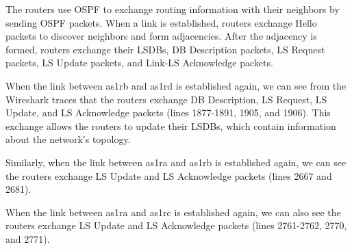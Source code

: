 The routers use OSPF to exchange routing information with their neighbors by sending OSPF packets. When a link is established, routers exchange Hello packets to discover neighbors and form adjacencies. After the adjacency is formed, routers exchange their LSDBs, DB Description packets, LS Request packets, LS Update packets, and Link-LS Acknowledge packets.


When the link between as1rb and as1rd is established again, we can see from the Wireshark traces that the routers exchange DB Description, LS Request, LS Update, and LS Acknowledge packets (lines 1877-1891, 1905, and 1906). This exchange allows the routers to update their LSDBs, which contain information about the network's topology.


Similarly, when the link between as1ra and as1rb is established again, we can see the routers exchange LS Update and LS Acknowledge packets (lines 2667 and 2681). 


When the link between as1ra and as1rc is established again, we can also see the routers exchange LS Update and LS Acknowledge packets (lines 2761-2762, 2770, and 2771).